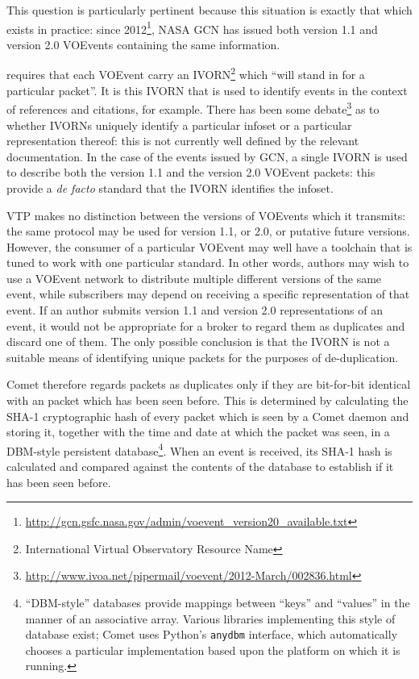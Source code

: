 \documentclass[5p,authoryear]{elsarticle}
\begin{document}
This question is particularly pertinent because this situation is exactly that
which exists in practice: since
2012\footnote{\url{http://gcn.gsfc.nasa.gov/admin/voevent_version20_available.txt}},
NASA GCN has issued both version 1.1 and version 2.0 VOEvents containing the
same information.

\citet{Seaman:2011} requires that each VOEvent carry an
IVORN\footnote{International Virtual Observatory Resource Name} which ``will
stand in for a particular packet''. It is this IVORN that is used to identify
events in the context of references and citations, for example. There has been
some
debate\footnote{\url{http://www.ivoa.net/pipermail/voevent/2012-March/002836.html}}
as to whether IVORNs uniquely identify a particular infoset or a particular
representation thereof: this is not currently well defined by the relevant
documentation. In the case of the events issued by GCN, a single IVORN is used
to describe both the version 1.1 and the version 2.0 VOEvent packets: this
provide a \textit{de facto} standard that the IVORN identifies the infoset.

VTP makes no distinction between the versions of VOEvents which it transmits:
the same protocol may be used for version 1.1, or 2.0, or putative future
versions. However, the consumer of a particular VOEvent may well have a
toolchain that is tuned to work with one particular standard. In other words,
authors may wish to use a VOEvent network to distribute multiple different
versions of the same event, while subscribers may depend on receiving a
specific representation of that event. If an author submits version 1.1 and
version 2.0 representations of an event, it would not be appropriate for a
broker to regard them as duplicates and discard one of them. The only possible
conclusion is that the IVORN is not a suitable means of identifying unique
packets for the purposes of de-duplication.

Comet therefore regards packets as duplicates only if they are bit-for-bit
identical with an packet which has been seen before. This is determined by
calculating the SHA-1 \citep{Eastlake:2001} cryptographic hash of every packet
which is seen by a Comet daemon and storing it, together with the time and
date at which the packet was seen, in a DBM-style \citep{DBM:1979} persistent
database\footnote{``DBM-style'' databases provide mappings between ``keys''
and ``values'' in the manner of an associative array. Various libraries
implementing this style of database exist; Comet uses Python's \texttt{anydbm}
interface, which automatically chooses a particular implementation based upon
the platform on which it is running.}. When an event is received, its SHA-1
hash is calculated and compared against the contents of the database to
establish if it has been seen before.
\end{document}

